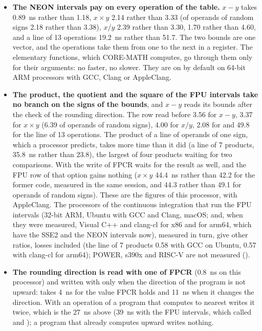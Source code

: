 \documentclass[12pt,a4paper,twoside,openright]{book}
\begin{document}
\begin{itemize}
\item[$\bullet$] \textbf{The NEON intervals pay on every operation of the
  table.} $x - y$ takes 0.89~ns rather than 1.18, $x \times y$ 2.14 rather
  than 3.33 (of operands of random signs 2.18 rather than 3.38), $x / y$
  2.39 rather than 3.30,  1.70 rather than 4.60, and a line of 13
  operations 19.2~ns rather than 51.7. The two bounds are one vector, and the
  operations take them from one to the next in a register. The elementary
  functions, which CORE-MATH computes, go through them only for their
  arguments: no faster, no slower. They are on by default on 64-bit ARM
  processors with GCC, Clang or AppleClang.
\item[$\bullet$] \textbf{The product, the quotient and the square of the FPU
  intervals take no branch on the signs of the bounds}, and $x - y$ reads its
  bounds after the check of the rounding direction.\newinvfive{} The row read
  before 3.56 for $x - y$, 3.37 for $x \times y$ (6.39 of operands of random
  signs), 4.00 for $x / y$, 2.08 for  and 49.8 for the line of 13
  operations. The product of a line of operands of one sign, which a processor
  predicts, takes more time than it did (a line of 7 products, 35.8~ns rather
  than 23.8), the largest of four products waiting for two comparisons. With
   the write of FPCR waits for the result as
  well, and the FPU row of that option gains nothing ($x \times y$ 44.4~ns
  rather than 42.2 for the former code, measured in the same session, and
  44.3 rather than 49.1 for operands of random signs). These are the figures
  of this processor, with AppleClang. The processors of the continuous
  integration that run the FPU intervals (32-bit ARM, Ubuntu with GCC and
  Clang, macOS; and, when they were measured, Visual C++ and clang-cl for x86
  and for arm64, which have the SSE2 and the NEON intervals now), measured in
  turn, give other ratios, losses included (the line of 7 products 0.58 with
  GCC on Ubuntu, 0.57 with clang-cl for arm64); POWER, s390x and RISC-V are
  not measured ().
\item[$\bullet$] \textbf{The rounding direction is read with one 
  of FPCR} (0.8~ns on this processor) and written with  only when
  the direction of the program is not upward:  takes 4~ns for the
  value FPCR holds and 11~ns when it changes the direction. With
   an operation of a program that computes
  to nearest writes it twice, which is the 27~ns above (39~ns with the FPU
  intervals, which called  and ); a
  program that already computes upward writes nothing.
\end{itemize}
\end{document}
